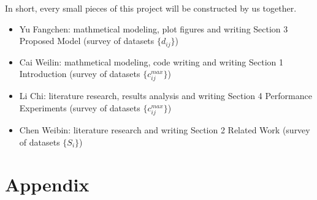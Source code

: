 \documentclass[11pt,twocolumn]{article}
\begin{document}
In short, every small pieces of this project will be constructed by us together.
\begin{itemize}
    \item Yu Fangchen: mathmetical modeling, plot figures and writing Section 3 Proposed Model (survey of datasets $\{d_{ij}\}$) 
    \item Cai Weilin: mathmetical modeling, code writing and writing Section 1 Introduction (survey of datasets $\{c_{ij}^{max}\}$) 
    \item Li Chi: literature research, results analysis and writing Section 4 Performance Experiments (survey of datasets $\{c_{ij}^{max}\}$) 
    \item Chen Weibin: literature research and writing Section 2 Related Work (survey of datasets $\{S_i\}$) 
\end{itemize}







\clearpage
\section*{Appendix}


\end{document}
